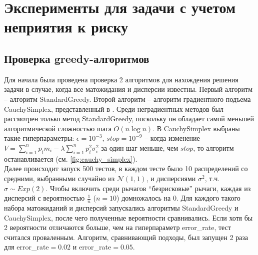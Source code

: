 
\chapter{Эксперименты для задачи с учетом неприятия к риску} %

\label{ExperimentsAversion} %


\section{Проверка greedy-алгоритмов}

Для начала была проведена проверка 2 алгоритмов для нахождения решения задачи в случае, когда все матожидания и дисперсии известны. Первый алгоритм -- алгоритм StandardGreedy. Второй алгоритм -- алгоритм градиентного подъема CauchySimplex, представленный в \cite{cauchy_simplex}. Среди неградиентных методов был рассмотрен только метод StandardGreedy, поскольку он обладает самой меньшей алгоритмической сложностью шага $O(n \log n)$. В CauchySimplex выбраны такие гиперпараметры: $\epsilon = 10^{-3}$, $stop = 10^{-9}$ -- когда изменение $V = \sum_{i=1}^n p_i m_i - \lambda \sum_{i=1}^n p_i^2 \sigma_i^2$ за один шаг меньше, чем $stop$, то алгоритм останавливается (см. \ref{fig:cauchy_simplex}). \\

Далее происходит запуск 500 тестов, в каждом тесте было 10 распределений со средними, выбранными случайно из $\mathcal{N}(1,1)$, и дисперсиями $\sigma^2$, т.ч. $\sigma \sim Exp(2)$.  Чтобы включить среди рычагов ``безрисковые'' рычаги, каждая из дисперсий с вероятностью $\frac{1}{n}$ ($n=10$) домножалось на 0. Для каждого такого набора матожиданий и дисперсий запускались алгоритмы StandardGreedy и CauchySimplex, после чего полученные вероятности сравнивались. Если хотя бы 2 вероятности отличаются больше, чем на гиперпараметр error\_rate, тест считался проваленным. Алгоритм, сравнивающий подходы, был запущен 2 раза для error\_rate$=0.02$ и error\_rate$=0.05$. \\

